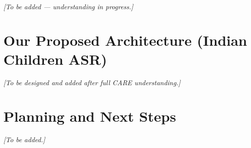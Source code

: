 \documentclass[12pt, a4paper]{article}
\begin{document}
\textit{[To be added --- understanding in progress.]}

\section{Our Proposed Architecture (Indian Children ASR)}

\textit{[To be designed and added after full CARE understanding.]}

\section{Planning and Next Steps}

\textit{[To be added.]}

\end{document}
